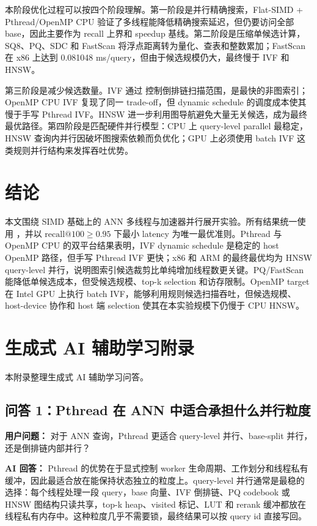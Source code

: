 \documentclass[11pt,a4paper]{article}
\makeatletter
\newcommand{\code}[1]{\texttt{\detokenize{#1}}}
\newcommand{\targetrecall}{\ensuremath{\mathrm{recall@100}\ge 0.95}}
\makeatother
\begin{document}
本阶段优化过程可以按四个阶段理解。第一阶段是并行精确搜索，Flat-SIMD + Pthread/OpenMP CPU 验证了多线程能降低精确搜索延迟，但仍要访问全部 base，因此主要作为 recall 上界和 speedup 基线。第二阶段是压缩单候选计算，SQ8、PQ、SDC 和 FastScan 将浮点距离转为量化、查表和整数累加；FastScan 在 x86 上达到 0.081048 ms/query，但由于候选规模仍大，最终慢于 IVF 和 HNSW。

第三阶段是减少候选数量。IVF 通过 \code{nprobe} 控制倒排链扫描范围，是最快的非图索引；OpenMP CPU IVF 复现了同一 trade-off，但 dynamic schedule 的调度成本使其慢于手写 Pthread IVF。HNSW 进一步利用图导航避免大量无关候选，成为最终最优路径。第四阶段是匹配硬件并行模型：CPU 上 query-level parallel 最稳定，HNSW 查询内并行因破坏图搜索依赖而负优化；GPU 上必须使用 batch IVF 这类规则并行结构来发挥吞吐优势。

\section{结论}

本文围绕 SIMD 基础上的 ANN 多线程与加速器并行展开实验。所有结果统一使用 \code{recall@100}，并以 \targetrecall{} 下最小 latency 为唯一最优准则。Pthread 与 OpenMP CPU 的双平台结果表明，IVF dynamic schedule 是稳定的 host OpenMP 路径，但手写 Pthread IVF 更快；x86 和 ARM 的最终最优均为 HNSW query-level 并行，说明图索引候选裁剪比单纯增加线程数更关键。PQ/FastScan 能降低单候选成本，但受候选规模、top-k selection 和访存限制。OpenMP target 在 Intel GPU 上执行 batch IVF，能够利用规则候选扫描吞吐，但候选规模、host-device 协作和 host 端 selection 使其在本实验规模下仍慢于 CPU HNSW。

\clearpage
\section*{生成式 AI 辅助学习附录}

本附录整理生成式 AI 辅助学习问答。

\subsection*{问答 1：Pthread 在 ANN 中适合承担什么并行粒度}
\noindent\textbf{用户问题：} 对于 ANN 查询，Pthread 更适合 query-level 并行、base-split 并行，还是倒排链内部并行？

\noindent\textbf{AI 回答：} Pthread 的优势在于显式控制 worker 生命周期、工作划分和线程私有缓冲，因此最适合放在能保持状态独立的粒度上。query-level 并行通常是最稳的选择：每个线程处理一段 query，base 向量、IVF 倒排链、PQ codebook 或 HNSW 图结构只读共享，top-k heap、visited 标记、LUT 和 rerank 缓冲都放在线程私有内存中。这种粒度几乎不需要锁，最终结果可以按 query id 直接写回。
\end{document}
